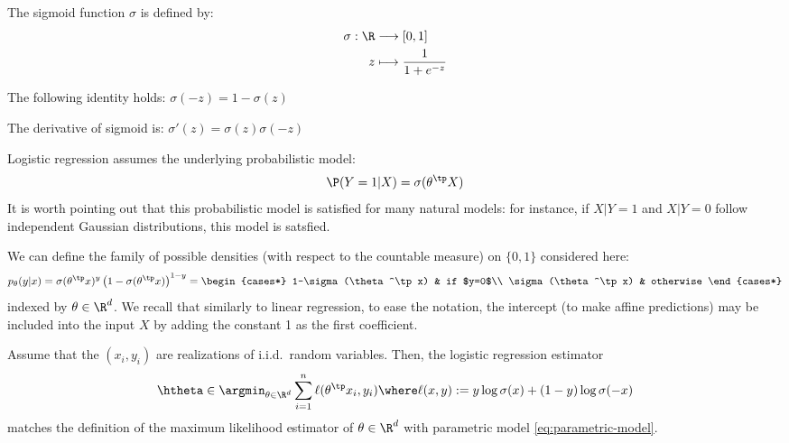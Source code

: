 \documentclass[toc, titlepaged]{../cs-classes/cs-classes}
\begin{document}
\begin{definition}
    The sigmoid function $\sigma$ is defined by:
    \begin{equation}
        \begin{aligned}
            \sigma : \R &\longrightarrow [0, 1]\\
            z &\longmapsto \frac{1}{1+e^{-z}}
        \end{aligned}
    \end{equation}
\end{definition}

\begin{property}
    The following identity holds: $\sigma(-z)=1-\sigma(z)$
\end{property}

\begin{property}
    The derivative of sigmoid is: $\sigma'(z)=\sigma(z)\sigma(-z)$
\end{property}

Logistic regression assumes the underlying probabilistic model:
\begin{equation*}
    \P(Y=1|X)=\sigma(\theta^\tp X)
\end{equation*}
It is worth pointing out that this probabilistic model is satisfied for many natural models: for instance, if $X|Y=1$ and $X|Y=0$ follow independent Gaussian distributions, this model is satsfied.

We can define the family of possible densities (with respect to the countable measure) on $\{0, 1\}$ considered here:
\begin{equation}
    \label{eq:parametric-model}
    p_\theta(y|x) = \sigma(\theta^\tp x)^y\left(1-\sigma(\theta^\tp x)\right)^{1-y} = \begin{cases*}
        1-\sigma(\theta^\tp x) & if $y=0$\\
        \sigma(\theta^\tp x) & otherwise
    \end{cases*}
\end{equation}
indexed by $\theta\in\R^d$. We recall that similarly to linear regression, to ease the notation, the intercept (to make affine predictions) may be included into the input $X$ by adding the constant 1 as the first coefficient.

\begin{property}
    Assume that the $(x_i, y_i)$ are realizations of i.i.d.~random variables. Then, the logistic regression estimator \begin{equation*}
        \htheta \in\argmin_{\theta\in\R^d} \sum_{i=1}^n \ell(\theta^\tp x_i, y_i) \where \ell(x, y) := y\log\sigma(x) + (1-y)\log\sigma(-x)
    \end{equation*}
    matches the definition of the maximum likelihood estimator of $\theta\in\R^d$ with parametric model \eqref{eq:parametric-model}.
\end{property}
\end{document}
